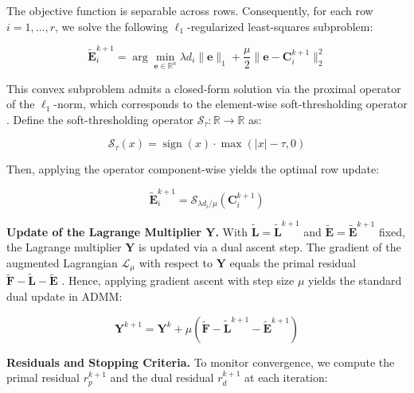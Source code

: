 The objective function is separable across rows. Consequently, for each row $i = 1, \ldots, r$, we solve the following $\ell_1$-regularized least-squares subproblem:

\begin{equation}
\tilde{\mathbf{E}}_{i}^{k+1} = \arg\min_{\mathbf{e} \in \mathbb{R}^n} \lambda d_i \|\mathbf{e}\|_1 + \frac{\mu}{2} \|\mathbf{e} - \mathbf{C}_{i}^{k+1}\|_2^2
\end{equation}

This convex subproblem admits a closed-form solution via the proximal operator of the $\ell_1$-norm, which corresponds to the element-wise soft-thresholding operator \cite{Proximal,neal2011distributed}. Define the soft-thresholding operator $\mathcal{S}_{\tau}: \mathbb{R} \to \mathbb{R}$ as:

\begin{equation}
\mathcal{S}_{\tau}(x) = \operatorname{sign}(x) \cdot \max(|x| - \tau, 0)
\end{equation}

Then, applying the operator component-wise yields the optimal row update:

\begin{equation}
\tilde{\mathbf{E}}_{i}^{k+1} = \mathcal{S}_{\lambda d_i / \mu}\left( \mathbf{C}_{i}^{k+1} \right)
\label{eq:E-update}
\end{equation}

\noindent\textbf{Update of the Lagrange Multiplier $\mathbf{Y}$.}
With $\tilde{\mathbf{L}} = \tilde{\mathbf{L}}^{k+1}$ and $\tilde{\mathbf{E}} = \tilde{\mathbf{E}}^{k+1}$ fixed, the Lagrange multiplier $\mathbf{Y}$ is updated via a dual ascent step. The gradient of the augmented Lagrangian $\mathcal{L}_{\mu}$ with respect to $\mathbf{Y}$ equals the primal residual $\tilde{\mathbf{F}} - \tilde{\mathbf{L}} - \tilde{\mathbf{E}}$ \cite{RPCA,neal2011distributed}. Hence, applying gradient ascent with step size $\mu$ yields the standard dual update in ADMM:

\begin{equation}
\mathbf{Y}^{k+1} = \mathbf{Y}^k + \mu \left( \tilde{\mathbf{F}} - \tilde{\mathbf{L}}^{k+1} - \tilde{\mathbf{E}}^{k+1} \right)
\label{eq:Y-update}
\end{equation}

\noindent\textbf{Residuals and Stopping Criteria.}
To monitor convergence, we compute the primal residual $r_p^{k+1}$ and the dual residual $r_d^{k+1}$ at each iteration:

